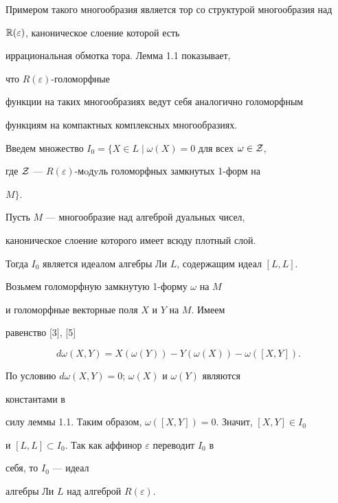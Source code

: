  


\begin{notenonum} 


Примером такого многообразия является тор со структурой многообразия над


$\Bbb R(\varepsilon)$, каноническое слоение которой есть


иррациональная обмотка тора. Лемма 1.1 показывает, 


что $R(\varepsilon)$-голоморфные 


функции на таких многообразиях ведут себя аналогично голоморфным 


функциям на компактных комплексных многообразиях. 


\end{notenonum} 




 


Введем множество $I_0=\{X\in L\mid \omega(X)=0$ для всех $\omega\in\cal 


Z$, 


где $\cal Z$ --- $R(\varepsilon)$-мoдyль голоморфных замкнутых 1-форм на 


$M\}$. 


 


\begin{props} 


Пусть $M$ --- многообразие над алгеброй дуальных чисел, 


каноническое слоение которого имеет всюду плотный слой.


Тогда $I_0$ является идеалом алгебры Ли $L$, содержащим идеал $[L,L]$. 


\end{props} 


 


\begin{pf} 


Возьмем голоморфную замкнутую 1-форму $\omega$ на $M$ 


и голоморфные векторные поля $X$ и $Y$ на $M$. Имеем 


равенство [3], [5]


$$ 


d\omega(X,Y)=X(\omega(Y))-Y(\omega(X))-\omega([X,Y]). 


$$ 


По условию $d\omega(X,Y)=0$; $\omega(X)$ и $\omega(Y)$ являются 


константами в 


силу леммы 1.1. Таким образом, $\omega([X,Y])=0$. Значит, $[X,Y]\in I_0$ 


и $[L,L]\subset I_0$. Так как аффинор $\varepsilon$ переводит $I_0$ в 


себя, то $I_0$ --- идеал 


алгебры Ли $L$ над алгеброй $R(\varepsilon)$. 


\end{pf} 


